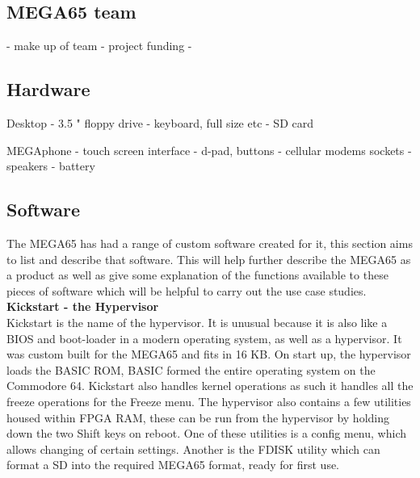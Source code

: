 \subsection{MEGA65 team}
- make up of team
- project funding
- 

\subsection{Hardware}
Desktop
- 3.5 " floppy drive
- keyboard, full size etc
- SD card

MEGAphone
- touch screen interface
- d-pad, buttons
- cellular modems sockets
- speakers
- battery

\subsection{Software}
The MEGA65 has had a range of custom software created for it, this section aims to list and describe that software. This will help further describe the MEGA65 as a product as well as give some explanation of the functions available to these pieces of software which will be helpful to carry out the use case studies.\\

\textbf{Kickstart - the Hypervisor}\\
Kickstart is the name of the hypervisor. It is unusual because it is also like a BIOS and boot-loader in a modern operating system, as well as a hypervisor. It was custom built for the MEGA65 and fits in 16 KB. On start up, the hypervisor loads the BASIC ROM, BASIC formed the entire operating system on the Commodore 64. Kickstart also handles kernel operations as such it handles all the freeze operations for the Freeze menu. The hypervisor also contains a few utilities housed within FPGA RAM, these can be run from the hypervisor by holding down the two Shift keys on reboot. One of these utilities is a config menu, which allows changing of certain settings. Another is the FDISK utility which can format a SD into the required MEGA65 format, ready for first use.\\

